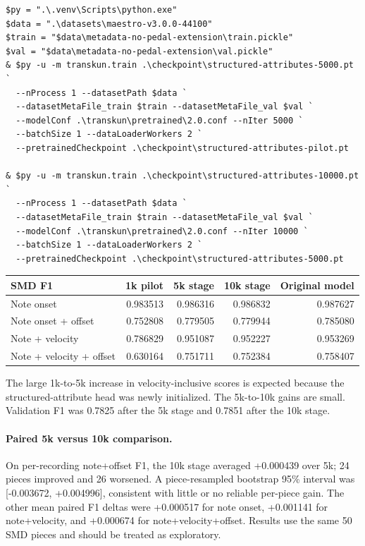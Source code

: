 \documentclass[11pt]{article}
\begin{document}
\begin{verbatim}
$py = ".\.venv\Scripts\python.exe"
$data = ".\datasets\maestro-v3.0.0-44100"
$train = "$data\metadata-no-pedal-extension\train.pickle"
$val = "$data\metadata-no-pedal-extension\val.pickle"
& $py -u -m transkun.train .\checkpoint\structured-attributes-5000.pt `
  --nProcess 1 --datasetPath $data `
  --datasetMetaFile_train $train --datasetMetaFile_val $val `
  --modelConf .\transkun\pretrained\2.0.conf --nIter 5000 `
  --batchSize 1 --dataLoaderWorkers 2 `
  --pretrainedCheckpoint .\checkpoint\structured-attributes-pilot.pt

& $py -u -m transkun.train .\checkpoint\structured-attributes-10000.pt `
  --nProcess 1 --datasetPath $data `
  --datasetMetaFile_train $train --datasetMetaFile_val $val `
  --modelConf .\transkun\pretrained\2.0.conf --nIter 10000 `
  --batchSize 1 --dataLoaderWorkers 2 `
  --pretrainedCheckpoint .\checkpoint\structured-attributes-5000.pt
\end{verbatim}

\begin{center}
\begin{tabular}{lrrrr}
\toprule
\textbf{SMD F1} & \textbf{1k pilot} & \textbf{5k stage} &
\textbf{10k stage} & \textbf{Original model} \\
\midrule
Note onset & 0.983513 & 0.986316 & 0.986832 & 0.987627 \\
Note onset + offset & 0.752808 & 0.779505 & 0.779944 & 0.785080 \\
Note + velocity & 0.786829 & 0.951087 & 0.952227 & 0.953269 \\
Note + velocity + offset & 0.630164 & 0.751711 & 0.752384 & 0.758407 \\
\bottomrule
\end{tabular}
\end{center}

The large 1k-to-5k increase in velocity-inclusive scores is expected because
the structured-attribute head was newly initialized. The 5k-to-10k gains are
small. Validation F1 was 0.7825 after the 5k stage and 0.7851 after the 10k
stage.

\paragraph{Paired 5k versus 10k comparison.}
On per-recording note+offset F1, the 10k stage averaged +0.000439 over 5k;
24 pieces improved and 26 worsened. A piece-resampled bootstrap 95\%
interval was [-0.003672, +0.004996], consistent with little or no reliable
per-piece gain. The other mean paired F1 deltas were +0.000517 for note
onset, +0.001141 for note+velocity, and +0.000674 for
note+velocity+offset. Results use the same 50 SMD pieces and should be
treated as exploratory.
\end{document}
